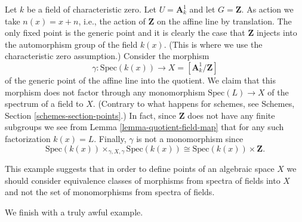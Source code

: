 \begin{example}
\label{example-affine-line-translation}
Let $k$ be a field of characteristic zero.
Let $U = \mathbf{A}^1_k$ and let $G = \mathbf{Z}$.
As action we take $n(x) = x + n$, i.e., the action of
$\mathbf{Z}$ on the affine line by translation.
The only fixed point is the generic point and it
is clearly the case that $\mathbf{Z}$ injects into
the automorphism group of the field $k(x)$. (This is
where we use the characteristic zero assumption.)
Consider the morphism
$$
\gamma : \text{Spec}(k(x)) \longrightarrow X = [\mathbf{A}^1_k/\mathbf{Z}]
$$
of the generic point of the affine line into the quotient.
We claim that this morphism does not factor through any
monomorphism $\text{Spec}(L) \to X$ of the spectrum of
a field to $X$. (Contrary to what happens for schemes, see
Schemes, Section \ref{schemes-section-points}.) In fact, since
$\mathbf{Z}$ does not have any finite subgroups we see from
Lemma \ref{lemma-quotient-field-map} that for any such
factorization $k(x) = L$. Finally, $\gamma$ is not a monomorphism
since
$$
\text{Spec}(k(x)) \times_{\gamma, X, \gamma} \text{Spec}(k(x))
\cong
\text{Spec}(k(x)) \times \mathbf{Z}.
$$
\end{example}

\noindent
This example suggests that in order to define points of an algebraic space
$X$ we should consider equivalence classes of morphisms from spectra
of fields into $X$ and not the set of monomorphisms from spectra of fields.

\medskip\noindent
We finish with a truly awful example.

